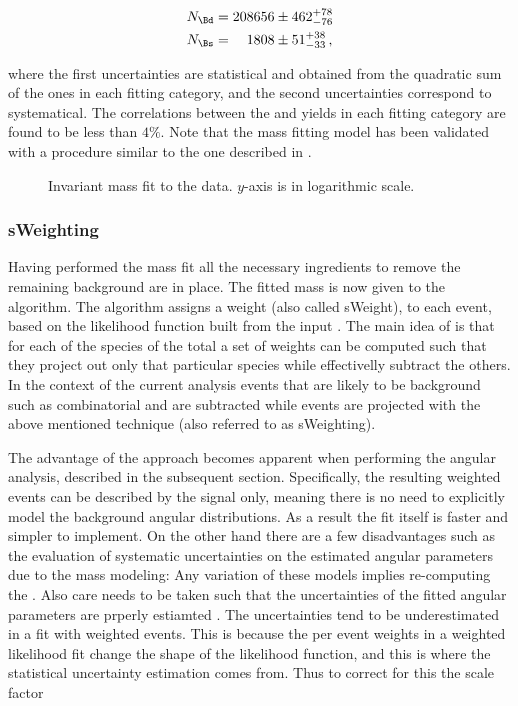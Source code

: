 \begin{align}
N_{\Bd} &= 208656  \pm  462 ^{+ 78	}_{- 76}\\
N_{\Bs} &= \phantom{00}1808  \pm   51 ^{+ 38	}_{- 33} \, ,
\label{signal_yields}
\end{align}

\noindent where the first uncertainties are statistical and obtained from the quadratic sum of the ones in each fitting category,
and the second uncertainties correspond to systematical. The correlations between the \Bd and \Bs yields in each fitting category
are found to be less than $4\%$. Note that the mass fitting model has been validated with a procedure similar to the
one described in .

\begin{figure}[!h]
\begin{center}
  \scalebox{0.5}{}
  \caption{Invariant mass fit to the data. $y$-axis is in logarithmic scale.}
  \label{mass_plot}
\end{center}
\end{figure}

\subsubsection{sWeighting}
Having performed the mass fit all the necessary ingredients to remove the remaining background are in place.
The fitted mass \pdf is now given to the \sPlot algorithm. The algorithm assigns a weight (also called sWeight), to each event,
based on the likelihood function built from the input \pdf. The main idea of \sPlot is that for each of the species of the total
\pdf a set of weights can be computed such that they project out only that particular species while effectivelly subtract the others.
In the context of the current analysis events that are likely to be background such as combinatorial and \LbJpsipK are
subtracted while \BJpsiKst events are projected with the above mentioned technique (also referred to as sWeighting).

The advantage of the \sWeights approach becomes apparent when performing the angular analysis, described in the subsequent section.
Specifically, the resulting weighted events can be described by the signal \pdf only, meaning there is no need to explicitly model
the background angular distributions. As a result the fit itself is faster and simpler to implement. On the other hand there are a few
disadvantages such as the evaluation of systematic uncertainties on the estimated angular parameters due to the mass \pdf modeling:
Any variation of these models implies re-computing the \sWeights. Also care needs to be taken such that the uncertainties
of the fitted angular parameters are prperly estiamted \cite{splot}. The uncertainties tend to be underestimated in a fit with weighted
events. This is because the per event weights in a weighted likelihood fit change the shape of the likelihood function, and this is
where the statistical uncertainty estimation comes from. Thus to correct for this the scale factor

